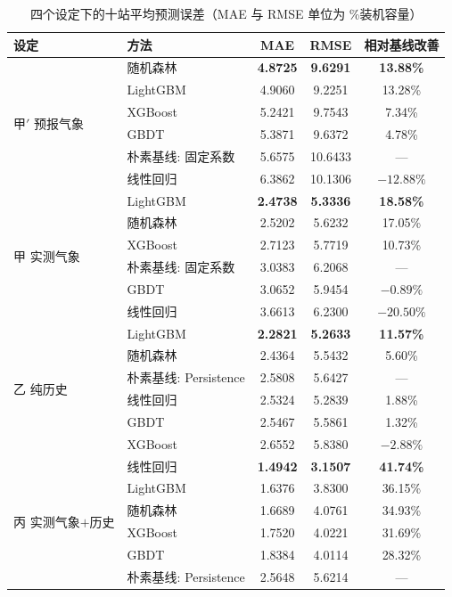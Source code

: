 \documentclass[11pt,a4paper]{ctexart}
\begin{document}
\begin{table}[htbp]
\centering
\small
\caption{四个设定下的十站平均预测误差（MAE 与 RMSE 单位为 \%装机容量）}
\label{tab:metrics}
\begin{tabular}{llccc}
\toprule
设定 & 方法 & MAE & RMSE & 相对基线改善 \\
\midrule
\multirow{6}{*}{甲$'$ 预报气象}
 & 随机森林        & \textbf{4.8725} & \textbf{9.6291} & \textbf{13.88\%} \\
 & LightGBM        & 4.9060 & 9.2251 & 13.28\% \\
 & XGBoost         & 5.2421 & 9.7543 & 7.34\%  \\
 & GBDT            & 5.3871 & 9.6372 & 4.78\%  \\
 & 朴素基线: 固定系数 & 5.6575 & 10.6433 & ---    \\
 & 线性回归        & 6.3862 & 10.1306 & $-12.88\%$ \\
\midrule
\multirow{6}{*}{甲 实测气象}
 & LightGBM        & \textbf{2.4738} & \textbf{5.3336} & \textbf{18.58\%} \\
 & 随机森林        & 2.5202 & 5.6232 & 17.05\% \\
 & XGBoost         & 2.7123 & 5.7719 & 10.73\% \\
 & 朴素基线: 固定系数 & 3.0383 & 6.2068 & ---    \\
 & GBDT            & 3.0652 & 5.9454 & $-0.89\%$ \\
 & 线性回归        & 3.6613 & 6.2300 & $-20.50\%$ \\
\midrule
\multirow{6}{*}{乙 纯历史}
 & LightGBM        & \textbf{2.2821} & \textbf{5.2633} & \textbf{11.57\%} \\
 & 随机森林        & 2.4364 & 5.5432 & 5.60\%  \\
 & 朴素基线: Persistence & 2.5808 & 5.6427 & ---  \\
 & 线性回归        & 2.5324 & 5.2839 & 1.88\%  \\
 & GBDT            & 2.5467 & 5.5861 & 1.32\%  \\
 & XGBoost         & 2.6552 & 5.8380 & $-2.88\%$ \\
\midrule
\multirow{6}{*}{丙 实测气象$+$历史}
 & 线性回归        & \textbf{1.4942} & \textbf{3.1507} & \textbf{41.74\%} \\
 & LightGBM        & 1.6376 & 3.8300 & 36.15\% \\
 & 随机森林        & 1.6689 & 4.0761 & 34.93\% \\
 & XGBoost         & 1.7520 & 4.0221 & 31.69\% \\
 & GBDT            & 1.8384 & 4.0114 & 28.32\% \\
 & 朴素基线: Persistence & 2.5648 & 5.6214 & ---  \\
\bottomrule
\end{tabular}
\end{table}
\end{document}
